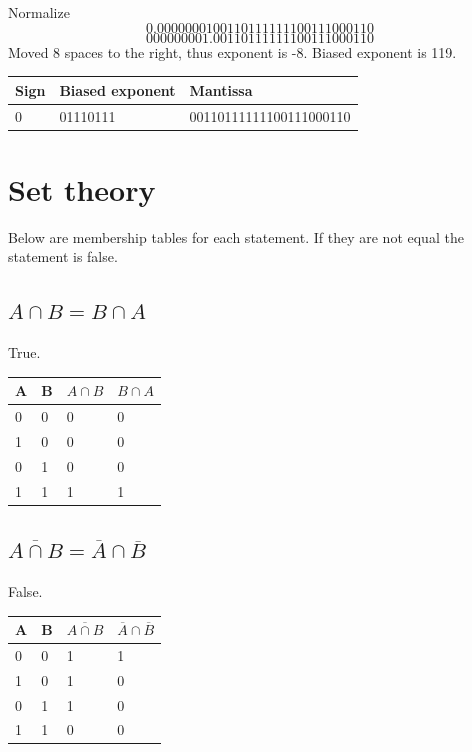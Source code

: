\documentclass[12pt]{article}
\begin{document}
Normalize
\[0.0000000100110111111100111000110\]
\[000000001.00110111111100111000110\]
Moved 8 spaces to the right, thus exponent is -8. Biased exponent is 119.


\begin{tabular}{l|l|l}
  Sign& Biased exponent & Mantissa \\
  \hline
  0 & 01110111 & 00110111111100111000110\\
\end{tabular}

\section{Set theory}
Below are membership tables for each statement. If they are not equal the statement is false.

\subsection{$A \cap B = B \cap A$}

True.

\begin{table}[H]
\begin{tabular}{ll|ll}
A & B & $A⁡ \cap ⁡B$ & $B \cap ⁡A$ \\ \hline
0 & 0 & 0         & 0         \\
1 & 0 & 0         & 0         \\
0 & 1 & 0         & 0         \\
1 & 1 & 1         & 1        
\end{tabular}
\end{table}

\subsection{$\overline{A \cap B} = \overline{A} \cap \overline{B}$}

False.

\begin{table}[H]
\begin{tabular}{ll|ll}
A & B & $\overline{A \cap B}$ & $\overline{A} \cap \overline{B}$ \\ \hline
0 & 0 & 1         & 1         \\
1 & 0 & 1         & 0         \\
0 & 1 & 1         & 0         \\
1 & 1 & 0         & 0        
\end{tabular}
\end{table}
\end{document}

